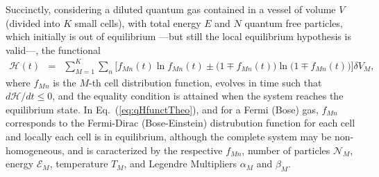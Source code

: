 Succinctly, considering a diluted quantum gas contained in a vessel of volume $V$ (divided into
$K$ small cells), with total energy $E$ and $N$ quantum free particles, which initially
is out of equilibrium ---but still the local equilibrium hypothesis is valid---,
the functional
%
\begin{eqnarray}\label{eq:qHfunctTheo}
    \mathcal{H} (t)&=&\sum_{M=1}^{K} \sum_{n} \bigg[ f_{Mn}(t) \ln f_{Mn}(t)\pm \Big(1 \mp f_{Mn}(t)) \ln (1 \mp f_{Mn}(t)\Big) \Big]   \delta V_M,
\end{eqnarray}
%
where $f_{Mn}$ is the $M$-th cell distribution function,
evolves in time such that $d\mathcal{H}/dt\leq0$, and the equality 
condition is attained when the system reaches
the equilibrium state. In Eq.~(\ref{eq:qHfunctTheo}), and for a Fermi (Bose)
gas, $f_{Mn}$ corresponds to the Fermi-Dirac (Bose-Einstein) distrubution function for each
cell and locally each cell is in equilibrium, although the complete system may be non-homogeneous,
and is caracterized by the respective $f_{Mn}$, number of particles $\mathcal{N}_M$, energy $\mathcal{E}_M$,
temperature $T_M$, and Legendre Multipliers $\alpha_M$ and $\beta_M$.


